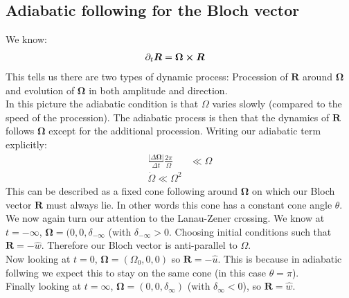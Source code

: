 \subsection{Adiabatic following for the Bloch vector}
We know:
\begin{align*}
	\partial_t \bm{R} &= \bm{\Omega}\cross\bm{R}
\end{align*}
This tells us there are two types of dynamic process: Procession of $\bm{R}$ around $\bm{\Omega}$ and evolution of $\bm{\Omega}$ in both amplitude and direction. \\
In this picture the adiabatic condition is that $\Omega$ varies slowly (compared to the speed of the procession). The adiabatic process is then that the dynamics of $\bm{R}$ follows $\bm{\Omega}$ except for the additional procession. Writing our adiabatic term explicitly:
\begin{align*}
	\frac{|\Delta\bm{\Omega}|}{\Delta t} \frac{2\pi}{\Omega} & \ll \Omega \\
	\dot{\Omega} \ll \Omega^2
\end{align*}
This can be described as a fixed cone following around $\bm{\Omega}$ on which our Bloch vector $\bm{R}$ must always lie. In other words this cone has a constant cone angle $\theta$. \\
We now again turn our attention to the Lanau-Zener crossing. We know at $t=-\infty$, $\bm{\Omega} = (0,0, \delta_{-\infty}$ (with $\delta_{-\infty} > 0$. Choosing initial conditions such that $\bm{R} = -\hat{w}$. Therefore our Bloch vector is anti-parallel to $\Omega$.\\
Now looking at $t=0$, $\bm{\Omega} = (\Omega_0,0,0)$ so $\bm{R} = -\hat{u}$. This is because in adiabatic follwing we expect this to stay on the same cone (in this case $\theta = \pi$).\\
Finally looking at $t=\infty$, $\bm{\Omega} = (0,0,\delta_\infty)$ (with $\delta_\infty < 0$), so $\bm{R} = \hat{w}$.
